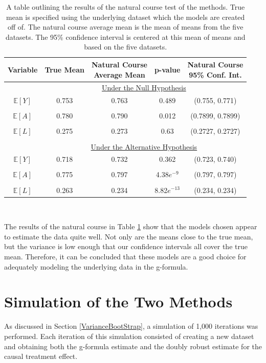 \begin{table}[h!]
\centering
\begin{tabular}{c | c c c c}
Variable & True Mean & \shortstack{Natural Course\\ Average Mean} & p-value & \shortstack{Natural Course \\95\% Conf. Int.} \\ 
\hline 
& \multicolumn{4}{c}{\underline{Under the Null Hypothesis}} \\
$\mathbb{E}[Y]$ & 0.753 & 0.763 & 0.489 &(0.755, 0.771) \\ \\
$\mathbb{E}[A]$ & 0.780 & 0.790 & 0.012 &(0.7899, 0.7899) \\ \\
$\mathbb{E}[L]$ & 0.275 & 0.273 & 0.63 & (0.2727, 0.2727) \\ \\ 
& \multicolumn{4}{c}{\underline{Under the Alternative Hypothesis}} \\
$\mathbb{E}[Y]$ & 0.718 & 0.732 &0.362 &(0.723, 0.740) \\ \\
$\mathbb{E}[A]$ & 0.775 & 0.797 &4.38$e^{-9}$ &(0.797, 0.797) \\ \\
$\mathbb{E}[L]$ & 0.263 & 0.234 & 8.82$e^{-13}$ & (0.234, 0.234) 
\end{tabular} \\
\centering
\caption[Natural course of the g-formula simulation]{A table outlining the results of the natural course test of the methods.  True mean is specified using the underlying dataset which the models are created off of.  The natural course average mean is the mean of means from the five datasets.  The 95\% confidence interval is centered at this mean of means and based on the five datasets. \label{naturalcourse}}
\end{table}

The results of the natural course in Table \ref{naturalcourse} show that the models chosen appear to estimate the data quite well.  Not only are the means close to the true mean, but the variance is low enough that our confidence intervals all cover the true mean.  Therefore, it can be concluded that these models are a good choice for adequately modeling the underlying data in the g-formula.  

\section{Simulation of the Two Methods} 
As discussed in Section \ref{VarianceBootStrap}, a simulation of 1,000 iterations was performed.  Each iteration of this simulation consisted of creating a new dataset and obtaining both the g-formula estimate and the doubly robust estimate for the causal treatment effect.  

